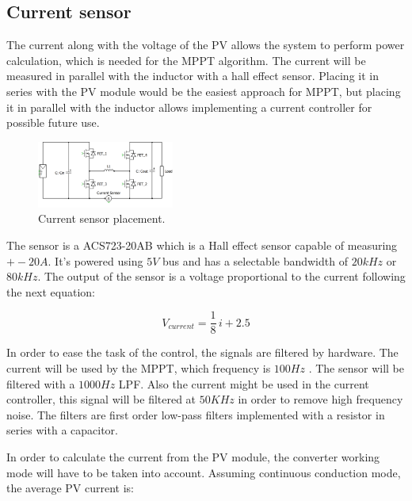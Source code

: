 \subsection{Current sensor} \label{current_sensor}

The current along with the voltage of the PV allows the system to perform power calculation, which is needed for the MPPT algorithm. The current will be measured in parallel with the inductor with a hall effect sensor. Placing it in series with the PV module would be the easiest approach for MPPT, but placing it in parallel with the inductor allows implementing a current controller for possible future use.

\begin{figure}[htbp]
	\begin{center}
		\includegraphics[width=0.4\textwidth]{../Pictures/current_sensor_placement.png}
		\caption{Current sensor placement.}
		\label{current_sensor_placement}
	\end{center}	
\end{figure}

The sensor is a ACS723-20AB which is a Hall effect sensor capable of measuring $+-20 A$. It's powered using $5 V$ bus and has a selectable bandwidth of $20 kHz$ or $80 kHz$. The output of the sensor is a voltage proportional to the current following the next equation:

\begin{equation} 
V_{current} = \frac{1}{8} \, i + 2.5
\end{equation} 

In order to ease the task of the control, the signals are filtered by hardware. The current will be used by the MPPT, which frequency is $100 Hz$ . The sensor will be filtered with a $1000 Hz$ LPF. Also the current might be used in the current controller, this signal will be filtered at $50 KHz$  in order to remove high frequency noise. The filters are first order low-pass filters implemented with a resistor in series with a capacitor.

In order to calculate the current from the PV module, the converter working mode will have to be taken into account. Assuming continuous conduction mode, the average PV current is:


